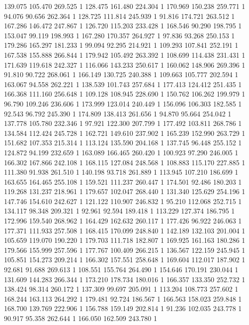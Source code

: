 	139.075	105.470	269.525	1
	128.475	161.480	224.304	1
	170.969	150.238	259.771	1
	94.076	90.656	262.364	1
	128.725	111.814	245.939	1
	91.816	174.721	263.512	1
	167.286	146.472	247.867	1
	126.720	115.203	233.428	1
	168.546	90.290	198.795	1
	153.047	99.119	198.993	1
	167.280	170.357	264.927	1
	97.836	93.268	250.153	1
	179.286	165.297	181.233	1
	99.094	92.295	214.921	1
	109.293	107.841	252.191	1
	167.538	155.888	266.844	1
	179.942	105.492	263.392	1
	108.699	114.438	231.431	1
	171.639	119.618	242.327	1
	116.066	143.233	250.617	1
	160.062	148.906	269.396	1
	91.810	90.722	268.061	1
	166.149	130.725	240.388	1
	109.663	105.777	202.594	1
	163.067	94.558	262.221	1
	138.539	101.743	257.684	1
	177.413	124.412	251.435	1
	166.368	111.160	256.648	1
	109.128	108.945	228.690	1
	150.762	106.262	199.979	1
	96.790	109.246	236.606	1
	173.999	123.014	240.449	1
	156.096	106.303	182.585	1
	92.543	96.792	245.390	1
	174.809	138.413	261.656	1
	94.870	95.664	254.042	1
	137.778	105.780	232.346	1
	97.921	122.300	207.799	1
	177.492	103.811	268.786	1
	134.584	112.424	245.728	1
	162.721	149.610	237.902	1
	165.239	152.990	263.729	1
	151.682	107.353	215.314	1
	113.124	135.590	204.168	1
	137.745	96.448	255.152	1
	124.872	94.199	232.659	1
	163.089	166.465	260.420	1
	100.923	97.290	246.005	1
	166.302	167.866	242.108	1
	168.115	127.084	248.568	1
	108.883	115.170	227.885	1
	111.380	91.938	261.510	1
	140.198	93.718	261.889	1
	113.945	107.210	186.699	1
	163.655	164.465	255.108	1
	159.521	111.237	260.447	1
	174.501	92.486	180.203	1
	119.268	131.237	218.961	1
	179.657	102.047	268.440	1
	131.340	125.629	254.196	1
	147.746	154.610	242.627	1
	121.122	110.907	246.832	1
	95.210	112.068	252.715	1
	134.117	98.348	209.321	1
	92.961	92.594	189.418	1
	113.229	127.374	186.795	1
	172.996	159.540	268.962	1
	164.429	162.632	260.117	1
	177.426	96.922	246.063	1
	177.371	111.933	257.508	1
	168.415	170.099	248.840	1
	142.189	132.103	201.004	1
	105.659	119.070	190.220	1
	179.703	111.718	182.807	1
	169.925	161.163	180.286	1
	179.566	155.999	257.596	1
	177.767	100.409	266.215	1
	136.567	122.159	245.945	1
	105.851	154.273	209.214	1
	166.302	157.551	258.648	1
	169.604	112.017	187.902	1
	92.681	91.688	269.613	1
	108.551	155.764	264.490	1
	154.646	170.191	230.044	1
	131.609	144.283	266.344	1
	173.210	178.734	180.016	1
	166.357	133.350	252.732	1
	138.424	98.314	260.172	1
	137.309	99.697	205.091	1
	113.204	108.773	257.602	1
	168.244	163.113	264.292	1
	179.481	92.724	186.567	1
	166.563	158.023	259.848	1
	168.700	139.769	222.906	1
	156.788	159.149	202.814	1
	91.236	102.035	243.778	1
	90.917	95.358	262.644	1
	166.050	162.509	243.780	1
